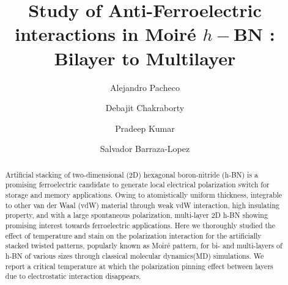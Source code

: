 \documentclass[apsrev,prl,twocolumn,superscriptaddress]{revtex4-2}
\begin{document}
\title{Study of Anti-Ferroelectric interactions in Moir\'{e} $h-$BN : Bilayer to Multilayer}
\author{Alejandro Pacheco}
\author{Debajit Chakraborty}
\author{Pradeep Kumar}
\author{Salvador Barraza-Lopez}


\begin{abstract}
{Artificial stacking of two-dimensional (2D) hexagonal boron-nitride (h-BN) is a promising ferroelectric candidate to generate local  electrical polarization switch for storage and memory applications. Owing to atomistically uniform thickness, integrable to other van der Waal (vdW) material through weak vdW interaction, high insulating property, and with a large spontaneous polarization, multi-layer 2D h-BN showing promising interest towards ferroelectric applications. Here we thoroughly studied the effect of temperature and stain on the polarization interaction for the artificially stacked twisted patterns, popularly known as Moir\'{e} pattern, for bi- and multi-layers of h-BN of various sizes through classical molecular dynamics(MD) simulations. We report a critical temperature at which the polarization pinning effect between layers due to electrostatic interaction disappears. }
\end{abstract}

\maketitle

\end{document}
